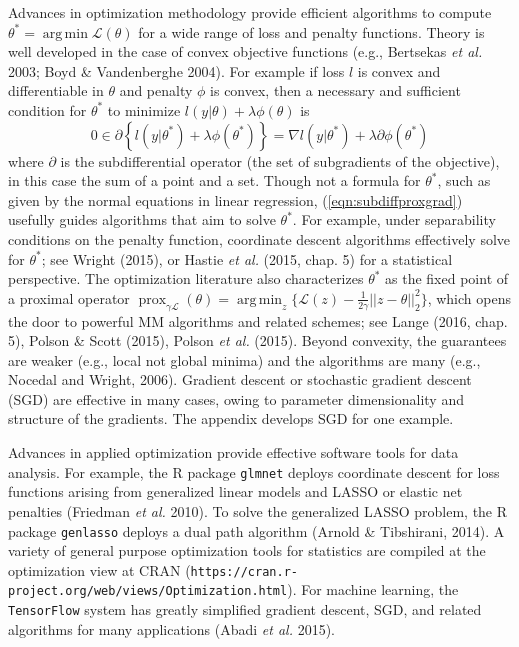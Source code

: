 \documentclass[12pt]{TD-CJS}
\newcommand{\prox}{ \mathop{\mathrm{prox}} }
\DeclareMathOperator*{\argmin}{arg\,min}
\begin{document}
Advances in optimization methodology provide efficient algorithms
to compute $\theta^* = \argmin \mathcal{L}(\theta)$  for a wide range of  loss and penalty functions. 
Theory is well developed in the case of convex objective functions (e.g., Bertsekas {\em et al.} 2003; Boyd \& Vandenberghe 2004). For example
if loss $l$ is convex and differentiable in $\theta$ and penalty $\phi$ is convex, then 
a necessary and sufficient condition for $\theta^*$ to minimize $ l(y|\theta) + \lambda\phi(\theta)$  is 
\begin{equation}
\label{eqn:subdiffproxgrad}
0 \in \partial \left\{ l(y|\theta^*) + \lambda\phi(\theta^*)\right\} = \nabla l(y|\theta^*) + \lambda\partial \phi(\theta^*) 
\end{equation}
where $\partial$ is the subdifferential operator (the set of subgradients of the objective), in this case
the sum of a point and a set.   Though not a formula for $\theta^*$, such as given by the normal equations in linear regression, 
(\ref{eqn:subdiffproxgrad}) usefully guides algorithms that aim to solve $\theta^*$.   
For example, under separability conditions on the penalty function, coordinate descent algorithms effectively solve for $\theta^*$;
see Wright (2015), or  Hastie {\em et al.} (2015, chap. 5) for a statistical perspective.
The optimization literature also characterizes $\theta^*$ as the fixed point of a proximal operator
$\prox_{\gamma \mathcal{L}}(\theta) = \argmin_z \{ \mathcal{L}(z) - \frac{1}{2\gamma} || z - \theta||_2^2  \}$, 
which opens the door to powerful MM algorithms and related schemes; 
 see Lange (2016, chap. 5), Polson \& Scott (2015), Polson {\em et al.} (2015).  
Beyond convexity, the guarantees are weaker (e.g., local
not global minima) and the algorithms are many (e.g., Nocedal and Wright, 2006).  Gradient descent
or stochastic gradient descent (SGD) are effective in many cases, owing to parameter 
dimensionality and structure of the gradients.  The appendix develops SGD for one example.

Advances in applied optimization provide effective software tools for data analysis. For example, the R package
\verb+glmnet+ deploys coordinate descent for loss functions arising from generalized linear models and LASSO or 
elastic net penalties (Friedman {\em et al.} 2010). To solve the generalized LASSO problem, the R package 
\verb+genlasso+  deploys a dual path algorithm (Arnold \& Tibshirani, 2014).  A variety of general 
purpose optimization tools for statistics are compiled at the optimization view at CRAN 
(\verb+https://cran.r-project.org/web/views/Optimization.html+). For machine learning, the \verb+TensorFlow+ system has greatly simplified 
gradient descent, SGD, and related algorithms for many applications (Abadi {\em et al.} 2015).  
\end{document}
